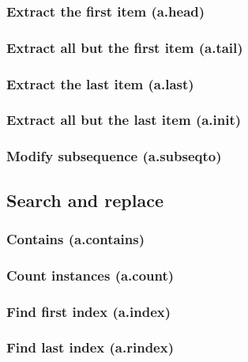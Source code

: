 \documentclass{article}
\theoremstyle{definition}
\begin{document}
\subsubsection{Extract the first item (a.head)}

\subsubsection{Extract all but the first item (a.tail)}

\subsubsection{Extract the last item (a.last)}

\subsubsection{Extract all but the last item (a.init)}

\subsubsection{Modify subsequence (a.subseqto)}

\subsection{Search and replace}

\subsubsection{Contains (a.contains)}

\subsubsection{Count instances (a.count)}

\subsubsection{Find first index (a.index)}

\subsubsection{Find last index (a.rindex)}
\end{document}
